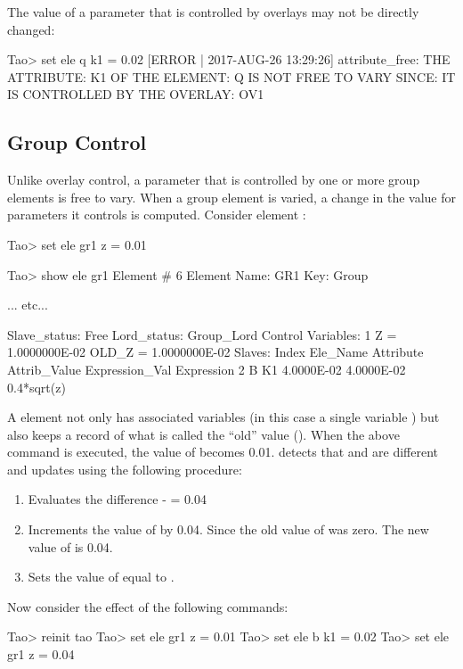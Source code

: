 \documentclass{hitec}
\begin{document}
The value of a parameter that is controlled by overlays may not be directly changed:
\begin{code}
Tao> set ele q k1 = 0.02
[ERROR | 2017-AUG-26 13:29:26] attribute_free:
    THE ATTRIBUTE: K1
    OF THE ELEMENT: Q
    IS NOT FREE TO VARY SINCE:
    IT IS CONTROLLED BY THE OVERLAY: OV1
\end{code}

\subsection{Group Control}

Unlike overlay control, a parameter that is controlled by one or more group elements is free to vary.
When a group element is varied, a change in the value for parameters it controls is computed.
Consider  element :
\begin{code} 
Tao> set ele gr1 z = 0.01

Tao> show ele gr1
 Element #                6
 Element Name: GR1
 Key: Group

... etc...    

Slave_status: Free
Lord_status:  Group_Lord
Control Variables:
    1   Z  =  1.0000000E-02           OLD_Z  =  1.0000000E-02
Slaves:
   Index   Ele_Name  Attribute   Attrib_Value  Expression_Val    Expression
       2   B         K1            4.0000E-02      4.0000E-02    0.4*sqrt(z)
\end{code}
A  element not only has associated variables (in this case a single variable ) but
\bmad also keeps a record of what is called the ``old'' value (). When the above  command is executed, the value of  becomes 0.01. \bmad detects that 
and  are different and updates  using the following procedure:
\begin{enumerate}
\item
Evaluates the difference  -  = 0.04
\item
Increments the value of  by 0.04.
Since the old value of  was zero. The new value of  is 0.04.
\item
Sets the value of  equal to .
\end{enumerate}

Now consider the effect of the following commands:
\begin{code}
Tao> reinit tao
Tao> set ele gr1 z = 0.01
Tao> set ele b k1 = 0.02
Tao> set ele gr1 z = 0.04
\end{code}
\end{document}
